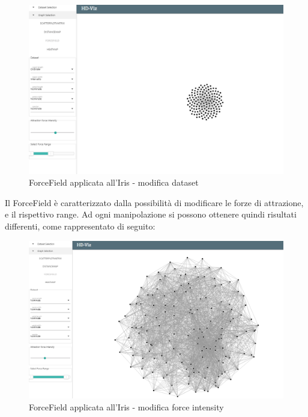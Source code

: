 \documentclass[../manuale_utente.tex]{subfiles}
\begin{document}
\begin{figure}[H]
	\centering
	\includegraphics[width=18cm]{src/img/ff/ff_iris_1}
	\caption{ForceField applicata all'Iris - modifica dataset}
\end{figure}


Il ForceField è caratterizzato dalla possibilità di modificare le forze di attrazione, e il rispettivo range. Ad ogni manipolazione si possono ottenere quindi risultati differenti, 
come rappresentato di seguito:

\begin{figure}[H]
	\centering
	\includegraphics[width=18cm]{src/img/ff/ff_iris_2}
	\caption{ForceField applicata all'Iris - modifica force intensity}
\end{figure}
\end{document}
